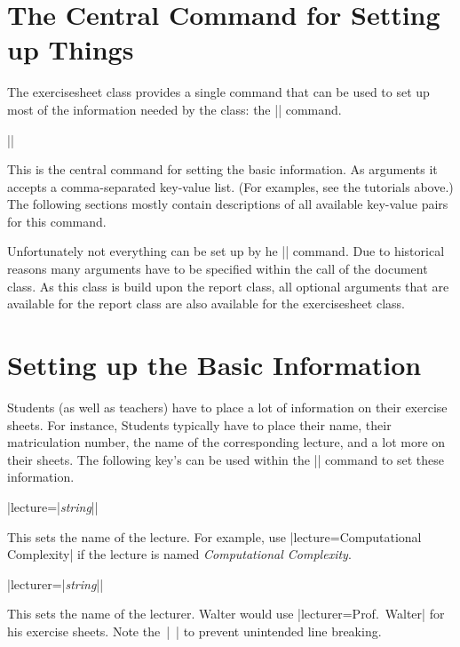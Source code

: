 \documentclass[a4paper,fleqn]{report}
\def\exercisesheet{{exercisesheet}}
\def\syntaxdefaultarg#1{\hfill\texttt{\small #1}\par\smallskip\noindent\ignorespaces}
\def\metaargument#1{\textit{\small #1}}
\begin{document}
\section{The Central Command for Setting up Things}

The \exercisesheet{} class provides a single command that can be used
to set up most of the information needed by the class: the
|\sheetconf| command.

\begin{syntax}
  |\sheetconf{|\metaargument{key-value list}|}|
  \syntaxdefaultarg{}
  This is the central command for setting the basic information. As
  arguments it accepts a comma-separated key-value list. (For
  examples, see the tutorials above.) The following sections mostly
  contain descriptions of all available key-value pairs for this
  command.

\end{syntax}

\noindent Unfortunately not everything can be set up by he
|\sheetconf| command. Due to historical reasons many arguments have to
be specified within the call of the document class. As this class is
build upon the report class, all optional arguments that are available
for the report class are also available for the \exercisesheet{}
class.


\section{Setting up the Basic Information}

Students (as well as teachers) have to place a lot of information on
their exercise sheets. For instance, Students typically have to place
their name, their matriculation number, the name of the corresponding
lecture, and a lot more on their sheets. The following key's can be
used within the |\sheetconf| command to set these information.

\begin{syntax}
  |lecture={|\metaargument{string}|}| \syntaxdefaultarg{}
  This sets the name of the lecture. For example, use
  |lecture={Computational Complexity}| if the lecture is named
  \emph{Computational Complexity}.
\end{syntax}

\begin{syntax}
  |lecturer={|\metaargument{string}|}| \syntaxdefaultarg{}
  This sets the name of the lecturer. Walter would use
  |lecturer={Prof.~Walter}| for his exercise sheets. Note the~|~|
  to prevent unintended line breaking.
\end{syntax}
\end{document}
